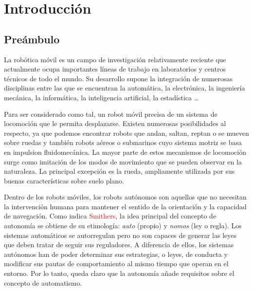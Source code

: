 \chapter{Introducción}\label{ch:introduccion}
\section{Preámbulo}

La robótica móvil es un campo de investigación relativamente reciente que actualmente ocupa importantes líneas de trabajo en laboratorios y centros técnicos de todo el mundo. Su desarrollo supone la integración de numerosas disciplinas entre las que se encuentran la automática, la electrónica, la ingeniería mecánica, la informática, la inteligencia artificial, la estadística \ldots

Para ser considerado como tal, un robot móvil precisa de un sistema de locomoción que le permita desplazarse. Existen numerosas posibilidades al respecto, ya que podemos encontrar robots que andan, saltan, reptan o se mueven sobre ruedas y también robots aéreos o submarinos cuyo sistema motriz se basa en impulsion fluidomecánica. La mayor parte de estos mecanismos de locomoción surge como imitación de los modos de movimiento que se pueden observar en la naturaleza. La principal excepción es la rueda, ampliamente utilizada por sus buenas características sobre suelo plano.

Dentro de los robots móviles, los robots autónomos son aquellos que no necesitan la intervención humana para mantener el sentido de la orientación y la capacidad de navegación. Como indica \textcolor{red}{Smithers}, la idea principal del concepto de autonomía se obtiene de su etimología: \emph{auto} (propio) y \emph{nomos} (ley o regla). Los sistemas automáticos se autorregulan pero no son capaces de generar las leyes que deben tratar de seguir sus reguladores. A diferencia de ellos, los sistemas autónomos han de poder determinar sus estrategias, o leyes, de conducta y modificar sus pautas de comportamiento al mismo tiempo que operan en el entorno. Por lo tanto, queda claro que la autonomía añade requisitos sobre el concepto de automatismo.

